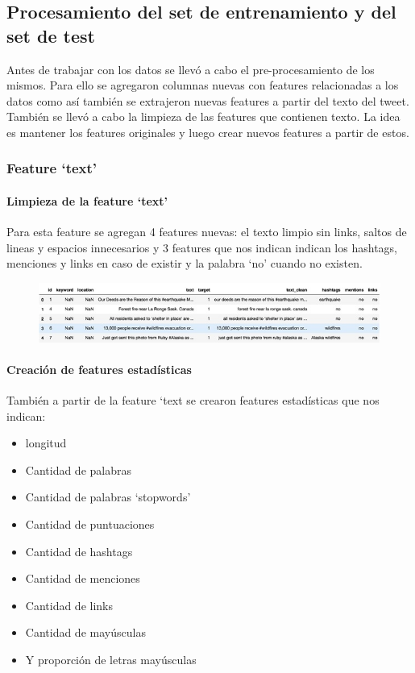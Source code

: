 \documentclass[12pt]{article}
\begin{document}
\subsection{Procesamiento del set de entrenamiento y del set de test}
Antes de trabajar con los datos se llevó a cabo el pre-procesamiento de los mismos.
Para ello se agregaron columnas nuevas con features relacionadas a los datos como así también se extrajeron nuevas features a partir del texto del tweet.
También se llevó a cabo la limpieza de las features que contienen texto.
La idea es mantener los features originales y luego crear nuevos features a partir de estos.


\subsubsection{Feature ‘text’}
\paragraph{Limpieza de la feature ‘text’\\}

Para esta feature se agregan 4 features nuevas: el texto limpio sin links, saltos de lineas y espacios innecesarios y 3 features que nos indican indican los hashtags, menciones y links en caso de existir y la palabra ‘no’ cuando no existen. 

\begin{figure}[H]
    \centering
    \includegraphics[scale = 0.9]{imgs/table_1.jpg}
    \label{tp:fig:location}
\end{figure}

\paragraph{Creación de features estadísticas\\}
\newline También a partir de la feature ‘text se crearon features estadísticas que nos indican:
\begin{itemize}
  \item longitud
  \item Cantidad de palabras
  \item Cantidad de palabras ‘stopwords’
  \item Cantidad de puntuaciones
  \item Cantidad de hashtags
  \item Cantidad de menciones
  \item Cantidad de links
  \item Cantidad de mayúsculas
  \item Y proporción de letras mayúsculas
\end{itemize}
\end{document}
